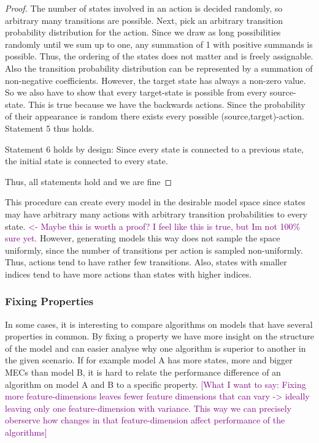 \begin{proof}
The number of states involved in an action is decided randomly, so arbitrary many transitions are possible. Next, pick an arbitrary transition probability distribution for the action. Since we draw as long possibilities randomly until we sum up to one, any summation of 1 with positive summands is possible. Thus, the ordering of the states does not matter and is freely assignable. Also the transition probability distribution can be represented by a summation of non-negative coefficients.
However, the target state has always a non-zero value. So we also have to show that every target-state is possible from every source-state. This is true because we have the backwards actions. Since the probability of their appearance is random there exists every possible (source,target)-action.
Statement 5 thus holds.

Statement 6 holds by design: Since every state is connected to a previous state, the initial state is connected to every state.

Thus, all statements hold and we are fine
\end{proof}

This procedure can create every model in the desirable model space since states may have arbitrary many actions with arbitrary transition probabilities to every state. \textcolor{purple}{ <- Maybe this is worth a proof? I feel like this is true, but Im not 100\% sure yet.} However, generating models this way does not sample the space uniformly, since the number of transitions per action is sampled non-uniformly. Thus, actions tend to have rather few transitions. Also, states with smaller indices tend to have more actions than states with higher indices.

\subsubsection{Fixing Properties}
In some cases, it is interesting to compare algorithms on models that have several properties in common. By fixing a property we have more insight on the structure of the model and can easier analyse why one algorithm is superior to another in the given scenario. If for example model A has more states, more and bigger MECs than model B, it is hard to relate the performance difference of an algorithm on model A and B to a specific property. \textcolor{purple}{[What I want to say: Fixing more feature-dimensions leaves fewer feature dimensions that can vary -> ideally leaving only one feature-dimension with variance. This way we can precisely oberserve how changes in that feature-dimension affect performance of the algorithms]} 

